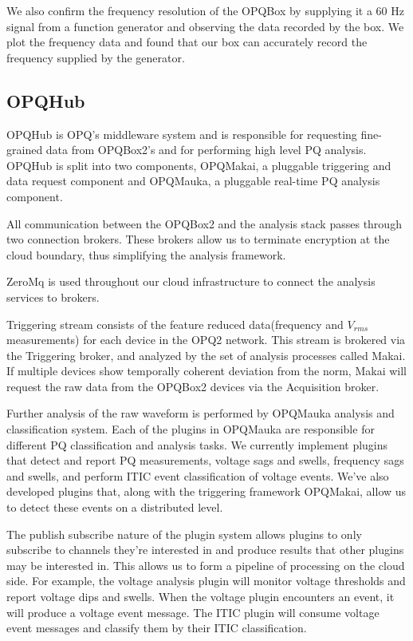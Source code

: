 \documentclass[conference]{IEEEtran}
\begin{document}
We also confirm the frequency resolution of the OPQBox by supplying it a 60 Hz signal from a function generator and observing the data recorded by the box. We plot the frequency data and found that our box can accurately record the frequency supplied by the generator.

\subsection{OPQHub}
OPQHub is OPQ's middleware system and is responsible for requesting fine-grained data from OPQBox2's and for performing high level PQ analysis.  OPQHub is split into two components, OPQMakai, a pluggable triggering and data request component and OPQMauka, a pluggable real-time PQ analysis component.

All communication between the OPQBox2 and the analysis stack passes through two connection brokers. These brokers allow us to terminate encryption at the cloud boundary, thus simplifying the analysis framework. 

ZeroMq is used throughout our cloud infrastructure to connect the analysis services to brokers. 

Triggering stream consists of the feature reduced data(frequency and $V_{rms}$ measurements) for each device in the OPQ2 network. This stream is brokered via the Triggering broker, and analyzed by the set of analysis processes called Makai. If multiple devices show temporally coherent deviation from the norm, Makai will request the raw data from the OPQBox2 devices via the Acquisition broker. 

Further analysis of the raw waveform is performed by OPQMauka analysis and classification system.  Each of the plugins in OPQMauka are responsible for different PQ classification and analysis tasks. We currently implement plugins that detect and report PQ measurements, voltage sags and swells, frequency sags and swells, and perform ITIC event classification of voltage events. We've also developed plugins that, along with the triggering framework OPQMakai, allow us to detect these events on a distributed level.

The publish subscribe nature of the plugin system allows plugins to only subscribe to channels they're interested in and produce results that other plugins may be interested in. This allows us to form a pipeline of processing on the cloud side. For example, the voltage analysis plugin will monitor voltage thresholds and report voltage dips and swells. When the voltage plugin encounters an event, it will produce a voltage event message. The ITIC plugin will consume voltage event messages and classify them by their ITIC classification.
\end{document}
